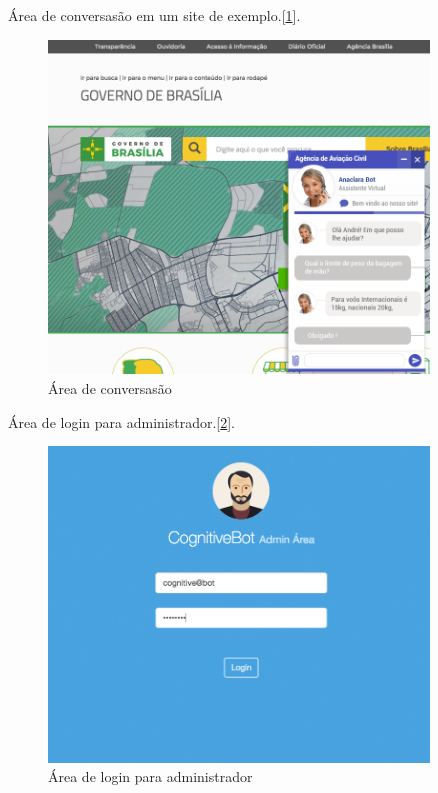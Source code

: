 \newpage

\par Área de conversasão em um site de exemplo.[\ref{fig:conversasao}].
\begin{figure}[!ht]
  \centering
      \includegraphics[width=0.9\textwidth]{no_site_gdf}
  \caption{Área de conversasão}
  \label{fig:conversasao}
\end{figure}

\newpage

\par Área de login para administrador.[\ref{fig:admin_login}].
\begin{figure}[!ht]
  \centering
      \includegraphics[width=0.9\textwidth]{admin_login}
  \caption{Área de login para administrador}
  \label{fig:admin_login}
\end{figure}

